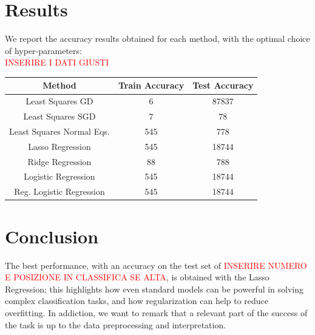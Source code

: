 \documentclass[10pt,conference,compsocconf]{IEEEtran}
\begin{document}
\section{Results}
\label{results}
We report the accuracy results obtained for each method, with the optimal choice of hyper-parameters: \\

\textcolor{red}{INSERIRE I DATI GIUSTI}
\begin{center}
\label{table1}
\begin{tabular}{|c c c|} 
 \hline
 Method & Train Accuracy & Test Accuracy  \\ [0.5ex] 
 \hline\hline
 Least Squares GD & 6 & 87837  \\ 
 \hline
 Least Squares SGD & 7 & 78 \\
 \hline
 Least Squares Normal Eqs. & 545 & 778  \\
 \hline
 Lasso Regression & 545 & 18744  \\
 \hline
 Ridge Regression & 88 & 788  \\ 
 \hline
 Logistic Regression & 545 & 18744  \\
 \hline
 Reg. Logistic Regression & 545 & 18744  \\
 \hline
\end{tabular}
\end{center}



\section{Conclusion}

The best performance, with an accuracy on the test set of \textcolor{red}{INSERIRE NUMERO E POSIZIONE IN CLASSIFICA SE ALTA}, is obtained with the Lasso Regression; this highlights how even standard models can be powerful in solving complex classification tasks, and how regularization can help to reduce overfitting.
In addiction, we want to remark that a relevant part of the success of the task is up to the data preprocessing and interpretation.
\end{document}
